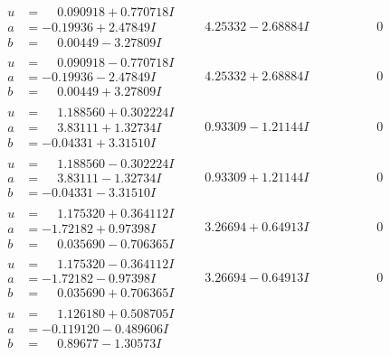 \documentclass[1p]{elsarticle_modified}
\theoremstyle{definition}
\begin{document}
$$\begin{array}{c|c|c}
\begin{aligned}
u &= \phantom{-}0.090918 + 0.770718 I \\
a &= -0.19936 + 2.47849 I \\
b &= \phantom{-}0.00449 - 3.27809 I\end{aligned}
 & \phantom{-}4.25332 - 2.68884 I & \phantom{-0.000000 } 0 \\ \hline\begin{aligned}
u &= \phantom{-}0.090918 - 0.770718 I \\
a &= -0.19936 - 2.47849 I \\
b &= \phantom{-}0.00449 + 3.27809 I\end{aligned}
 & \phantom{-}4.25332 + 2.68884 I & \phantom{-0.000000 } 0 \\ \hline\begin{aligned}
u &= \phantom{-}1.188560 + 0.302224 I \\
a &= \phantom{-}3.83111 + 1.32734 I \\
b &= -0.04331 + 3.31510 I\end{aligned}
 & \phantom{-}0.93309 - 1.21144 I & \phantom{-0.000000 } 0 \\ \hline\begin{aligned}
u &= \phantom{-}1.188560 - 0.302224 I \\
a &= \phantom{-}3.83111 - 1.32734 I \\
b &= -0.04331 - 3.31510 I\end{aligned}
 & \phantom{-}0.93309 + 1.21144 I & \phantom{-0.000000 } 0 \\ \hline\begin{aligned}
u &= \phantom{-}1.175320 + 0.364112 I \\
a &= -1.72182 + 0.97398 I \\
b &= \phantom{-}0.035690 - 0.706365 I\end{aligned}
 & \phantom{-}3.26694 + 0.64913 I & \phantom{-0.000000 } 0 \\ \hline\begin{aligned}
u &= \phantom{-}1.175320 - 0.364112 I \\
a &= -1.72182 - 0.97398 I \\
b &= \phantom{-}0.035690 + 0.706365 I\end{aligned}
 & \phantom{-}3.26694 - 0.64913 I & \phantom{-0.000000 } 0 \\ \hline\begin{aligned}
u &= \phantom{-}1.126180 + 0.508705 I \\
a &= -0.119120 - 0.489606 I \\
b &= \phantom{-}0.89677 - 1.30573 I\end{aligned}

\end{array}$$
\end{document}
